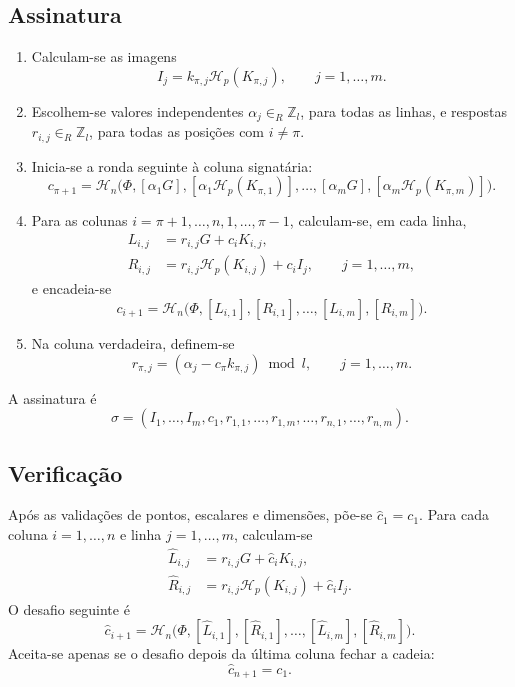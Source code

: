 \subsection*{Assinatura}

\begin{enumerate}
    \item Calculam-se as imagens
    \[
    I_j=k_{\pi,j}\mathcal H_p(K_{\pi,j}),
    \qquad j=1,\ldots,m.
    \]

    \item Escolhem-se valores independentes
    \(\alpha_j\in_R\mathbb Z_l\), para todas as linhas, e respostas
    \(r_{i,j}\in_R\mathbb Z_l\), para todas as posições com
    \(i\neq\pi\).

    \item Inicia-se a ronda seguinte à coluna signatária:
    \[
    c_{\pi+1}=\mathcal H_n\bigl(
      \Phi,
      [\alpha_1G],[\alpha_1\mathcal H_p(K_{\pi,1})],
      \ldots,
      [\alpha_mG],[\alpha_m\mathcal H_p(K_{\pi,m})]
    \bigr).
    \]

    \item Para as colunas
    \(i=\pi+1,\ldots,n,1,\ldots,\pi-1\), calculam-se, em cada linha,
    \begin{align*}
    L_{i,j}&=r_{i,j}G+c_iK_{i,j},\\
    R_{i,j}&=r_{i,j}\mathcal H_p(K_{i,j})+c_iI_j,
       \qquad j=1,\ldots,m,
    \end{align*}
    e encadeia-se
    \[
    c_{i+1}=\mathcal H_n\bigl(
      \Phi,[L_{i,1}],[R_{i,1}],\ldots,[L_{i,m}],[R_{i,m}]
    \bigr).
    \]

    \item Na coluna verdadeira, definem-se
    \[
    r_{\pi,j}=(\alpha_j-c_\pi k_{\pi,j})\bmod l,
    \qquad j=1,\ldots,m.
    \]
\end{enumerate}

A assinatura é
\[
\sigma=(I_1,\ldots,I_m,c_1,
 r_{1,1},\ldots,r_{1,m},\ldots,r_{n,1},\ldots,r_{n,m}).
\]

\subsection*{Verificação}

Após as validações de pontos, escalares e dimensões, põe-se
\(\widehat c_1=c_1\). Para cada coluna \(i=1,\ldots,n\) e linha
\(j=1,\ldots,m\), calculam-se
\begin{align*}
\widehat L_{i,j}&=r_{i,j}G+\widehat c_iK_{i,j},\\
\widehat R_{i,j}
 &=r_{i,j}\mathcal H_p(K_{i,j})+\widehat c_iI_j.
\end{align*}
O desafio seguinte é
\[
\widehat c_{i+1}=\mathcal H_n\bigl(
 \Phi,
 [\widehat L_{i,1}],[\widehat R_{i,1}],\ldots,
 [\widehat L_{i,m}],[\widehat R_{i,m}]
\bigr).
\]
Aceita-se apenas se o desafio depois da última coluna fechar a cadeia:
\[
\widehat c_{n+1}=c_1.
\]

